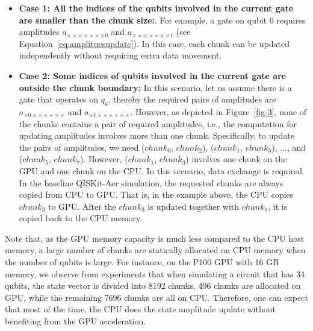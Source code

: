 \begin{itemize}
\item \textbf{Case 1: All the indices of the qubits involved in the current gate are smaller than the chunk size:}. For example, a gate on qubit $0$ requires amplitudes $a_{\times\times\times\times\times\times\times0}$ and $a_{\times\times\times\times\times\times\times1}$ 
(see Equation~\ref{eq:amplituesupdate}). In this case,  each chunk can be updated independently without requiring extra data movement. 

\item \textbf{Case 2: Some indices of qubits involved in the current gate are outside the chunk boundary:} In this scenario, let us assume there is a gate that operates on $q_6$, thereby the required pairs of amplitudes are $a_{\times0\times\times\times\times\times\times}$ and $a_{\times1\times\times\times\times\times\times}$. However, as depicted in Figure~\ref{fig-3}, none of the chunks contains a pair of required amplitudes, i.e., the computation for updating amplitudes involves more than one chunk. 
Specifically, to update the pairs of amplitudes, we need ($chunk_0$, $chunk_2$), ($chunk_1$, $chunk_3$), $\dots$, and ($chunk_5$, $chunk_7$). However, ($chunk_1$, $chunk_3$) involves one chunk on the GPU and one chunk on the CPU. In this scenario, data exchange is required. 
In the baseline QISKit-Aer simulation, the requested chunks are always copied from CPU to GPU. That is, in the example above, the CPU copies $chunk_3$ to GPU. After the $chunk_3$ is updated together with $chunk_1$, it is copied back to the CPU memory. 

\end{itemize}

Note that, as the GPU memory capacity is much less compared to the CPU host memory, a large number of chunks are statically allocated on CPU memory when the number of qubits is large. For instance, on the P100 GPU with 16 GB memory, we observe from experiments that when simulating a circuit that has 34 qubits, the state vector is divided into 8192 chunks, 496 chunks are allocated on GPU, while the remaining 7696 chunks are all on CPU. Therefore, one can expect that most of the time, the CPU does the state amplitude update without benefiting from the GPU acceleration. 

